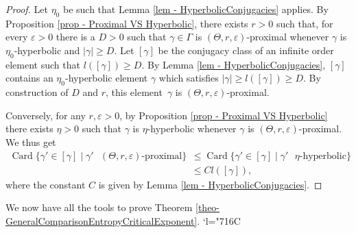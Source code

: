 \documentclass[JEP,XML,SOM,Unicode,NoEqCountersInSection,NoFloatCountersInSection,published]{cedram}
\newcommand{\Changelback}{\mathcode`l="716C}
\theoremstyle{definition}
\DeclareMathOperator{\Card}{Card}
\let\epsilon\varepsilon
\let\G\Gamma
\let\g\gamma
\begin{document}
\begin{proof}
Let $\eta_0$ be such that Lemma \ref{lem - HyperbolicConjugacies} applies. By Proposition \ref{prop - Proximal VS Hyperbolic}, there exists $r>0$ such that, for every $\epsilon>0$ there is a $D>0$ such that $\g\in \G$ is $(\Theta,r,\epsilon)$-proximal whenever $\g$ is $\eta_0$-hyperbolic and $\vert \g \vert \geq D$. Let $[\g]$ be the conjugacy class of an infinite order element such that $l([\g]) \geq D$. By Lemma \ref{lem - HyperbolicConjugacies}, $[\g]$ contains an $\eta_0$-hyperbolic element $\g$ which satisfies $\vert \g \vert \geq l([\g])\geq D$. By construction of $D$ and $r$, this element~$\g$ is $(\Theta,r,\epsilon)$-proximal.

Conversely, for any $r,\epsilon>0$, by Proposition \ref{prop - Proximal VS Hyperbolic} there exists $\eta >0$ such that $\g$ is $\eta$-hyperbolic whenever $\g$ is $(\Theta,r,\epsilon)$-proximal. We thus get
\begin{align*}\Card \{\g' \in [\g]\mid \g' \textrm{ $(\Theta,r,\epsilon)$-proximal}\} &\leq \Card \{\g' \in [\g] \mid \g' \textrm{ $\eta$-hyperbolic}\} \\
& \leq C l([\g]),
\end{align*}
where the constant $C$ is given by Lemma \ref{lem - HyperbolicConjugacies}.
\end{proof}

We now have all the tools to prove Theorem \ref{theo-GeneralComparisonEntropyCriticalExponent}.
\Changelback
\end{document}
